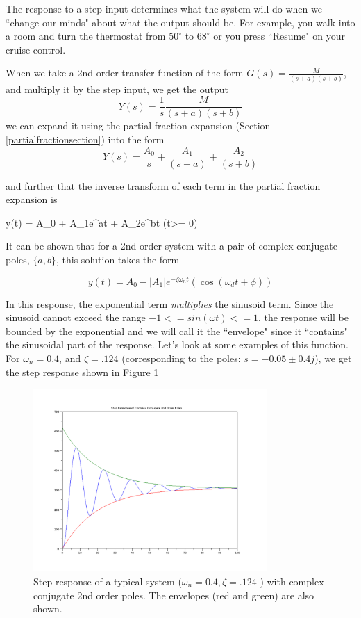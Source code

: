 The response to  a step input determines what the system will do when we ``change our minds" about what the output should be.  For example, you walk into a room and turn the thermostat from $50^\circ$ to $68^\circ$ or you press ``Resume" on your cruise control.


When we take a 2nd order transfer function of the form $G(s) = \frac{M}{(s+a)(s+b)}$, and multiply it by the step input, we get the output
\[
Y(s) = \frac{1}{s}\frac{M}{(s+a)(s+b)}
\]
we can expand it using the partial fraction expansion (Section \ref{partialfractionsection}) into the form
\[
Y(s) = \frac{A_0}{s} + \frac{A_1}{(s+a)}+  \frac{A_2}{(s+b)}
\]

and further that the inverse transform of each term in the partial fraction expansion is

\bq\label{dampedexponentialsolution}
y(t) = A_0 +  A_1e^{at} + A_2e^{bt}   \qquad (t>= 0)
\eq

It can be shown that for a 2nd order system with a pair of complex conjugate poles, $\{a,b\}$, this solution takes the form

\[
y(t) = A_0-|A_1|e^{-\zeta\omega_n t} (\cos({\omega_dt +\phi}))
\]

In this response, the exponential term {\it multiplies } the sinusoid term.  Since the sinusoid cannot exceed the range $-1<=sin(\omega t)<=1$, the response will be bounded by the exponential and we will call it the ``envelope" since it ``contains" the sinusoidal part of the response.
Let's look at some examples of this function.  For $\omega_n = 0.4$, and $\zeta=.124$ (corresponding to the poles: $s = -0.05\pm0.4j$), we get the step response shown in Figure \ref{typicalstep}



\begin{figure}\centering
\includegraphics[width=3.5in]{figs05/typical_stepa.png}
\caption{Step response of a typical system ($\omega_n = 0.4, \zeta=.124$ ) with complex conjugate 2nd order poles. The envelopes (red and green) are also shown.}\label{typicalstep}
\end{figure}


